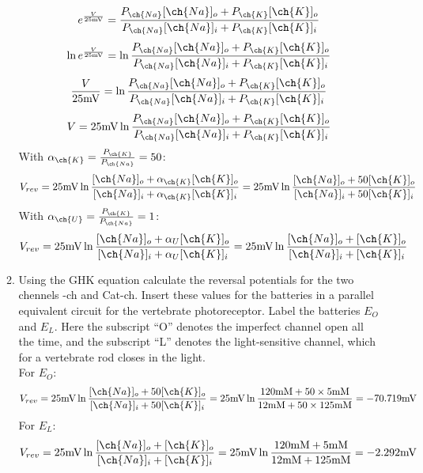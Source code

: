 \documentclass[11pt]{article}
\begin{document}
\begin{enumerate}[label=\arabic*.]
\begin{enumerate}[label=(\alph*)]
\begin{align*}
e^{\frac{V} {25 \text{mV}}} = \frac{P_{\ch{Na}} [\ch{Na}]_o + P_{\ch{K}} [\ch{K}]_o} {P_{\ch{Na}} [\ch{Na}]_i  + P_{\ch{K}} [\ch{K}]_i}
\end{align*}
\begin{align*}
\ln{e^{\frac{V} {25 \text{mV}}}} = \ln{\frac{P_{\ch{Na}} [\ch{Na}]_o + P_{\ch{K}} [\ch{K}]_o} {P_{\ch{Na}} [\ch{Na}]_i  + P_{\ch{K}} [\ch{K}]_i}}
\end{align*}
\begin{align*}
\frac{V} {25 \text{mV}} = \ln{\frac{P_{\ch{Na}} [\ch{Na}]_o + P_{\ch{K}} [\ch{K}]_o} {P_{\ch{Na}} [\ch{Na}]_i  + P_{\ch{K}} [\ch{K}]_i}}
\end{align*}
\begin{align*}
V = 25 \text{mV} \ln{\frac{P_{\ch{Na}} [\ch{Na}]_o + P_{\ch{K}} [\ch{K}]_o} {P_{\ch{Na}} [\ch{Na}]_i  + P_{\ch{K}} [\ch{K}]_i}}
\end{align*}
With $\alpha_{\ch{K}} = \frac{P_{\ch{K}}} {P_{\ch{Na}}} = 50$:
\begin{align*}
V_{rev} = 25 \text{mV} \ln{\frac{[\ch{Na}]_o + \alpha_{\ch{K}} [\ch{K}]_o} {[\ch{Na}]_i + \alpha_{\ch{K}} [\ch{K}]_i}} = 25 \text{mV} \ln{\frac{[\ch{Na}]_o + 50 [\ch{K}]_o} {[\ch{Na}]_i + 50 [\ch{K}]_i}}
\end{align*}
With $\alpha_{\ch{U}} = \frac{P_{\ch{K}}} {P_{\ch{Na}}} = 1$:
\begin{align*}
V_{rev} = 25 \text{mV} \ln{\frac{[\ch{Na}]_o + \alpha_{U} [\ch{K}]_o} {[\ch{Na}]_i + \alpha_{U} [\ch{K}]_i}} = 25 \text{mV} \ln{\frac{[\ch{Na}]_o + [\ch{K}]_o} {[\ch{Na}]_i + [\ch{K}]_i}}
\end{align*}



\item
Using the GHK equation calculate the reversal potentials for the two chennels -ch and Cat-ch. Insert these values for the batteries in a parallel equivalent circuit for the vertebrate photoreceptor. Label the batteries $E_O$ and $E_L$. Here the subscript ``O'' denotes the imperfect  channel open all the time, and the subscript ``L'' denotes the light-sensitive channel, which for a vertebrate rod closes in the light.
\vspace*{1\baselineskip}
\\
For $E_O$:
\begin{align*}
V_{rev} = 25 \text{mV} \ln{\frac{[\ch{Na}]_o + 50 [\ch{K}]_o} {[\ch{Na}]_i + 50 [\ch{K}]_i}} = 25 \text{mV} \ln{\frac{120 \text{mM} + 50 \times 5 \text{mM}} {12 \text{mM} + 50 \times 125 \text{mM}}} = -70.719 \text{mV}
\end{align*}
For $E_L$:
\begin{align*}
V_{rev} = 25 \text{mV} \ln{\frac{[\ch{Na}]_o + [\ch{K}]_o} {[\ch{Na}]_i + [\ch{K}]_i}} = 25 \text{mV} \ln{\frac{120 \text{mM} + 5 \text{mM}} {12 \text{mM} + 125 \text{mM}}} = -2.292 \text{mV}
\end{align*}




\end{enumerate}
\end{enumerate}
\end{document}
